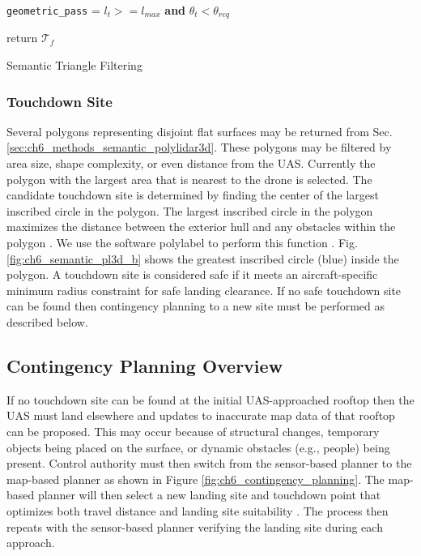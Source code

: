 \begin{algorithm}[ht]
{        
        \texttt{geometric\_pass} = $l_t>= l_{max}$ {\bf and} $\theta_t < \theta_{req}$  \\
        

    }
    return $\mathcal{T}_f$
    \caption[Semantic Triangle Filtering]{Semantic Triangle Filtering}
    \label{alg:triangle_filtering}
\end{algorithm}

\subsubsection{Touchdown Site}

Several polygons representing disjoint flat surfaces may be returned from Sec. \ref{sec:ch6_methods_semantic_polylidar3d}. These polygons may be filtered by area size, shape complexity, or even distance from the UAS. Currently the polygon with the largest area that is nearest to the drone is selected. The candidate touchdown site is determined by finding the center of the largest inscribed circle in the polygon. The largest inscribed circle in the polygon maximizes the distance between the exterior hull and any obstacles within the polygon \cite{castagno_map-based_2021, garcia-castellanos_poles_2007}. We use the software polylabel to perform this function \cite{noauthor_github_2018-3}. Fig. \ref{fig:ch6_semantic_pl3d_b} shows the greatest inscribed circle (blue) inside the polygon. A touchdown site is considered safe if it meets an aircraft-specific minimum radius constraint for safe landing clearance. If no safe touchdown site can be found then contingency planning to a new site must be performed as described below.

\subsection{Contingency Planning Overview}\label{sec:ch6_methods_contingency_planning}

If no touchdown site can be found at the initial UAS-approached rooftop then the UAS must land elsewhere and updates to inaccurate map data of that rooftop can be proposed. This may occur because of structural changes, temporary objects being placed on the surface, or dynamic obstacles (e.g., people) being present. Control authority must then switch from the sensor-based planner to the map-based planner as shown in Figure \ref{fig:ch6_contingency_planning}. The map-based planner will then select a new landing site and touchdown point that optimizes both travel distance and landing site suitability \cite{castagno_map-based_2021}. The process then repeats with the sensor-based planner verifying the landing site during each approach.

